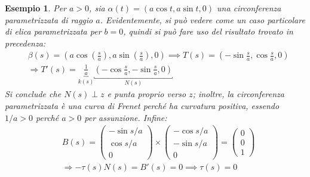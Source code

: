 \documentclass[12pt]{article}
\theoremstyle{style}
\newtheorem{esempio}{Esempio}[section]
\numberwithin{equation}{subsection}
\begin{document}
\begin{esempio}
Per $a>0$, sia $\alpha (t) = (a \cos t, a \sin t, 0)$ una circonferenza parametrizzata di raggio $a$.
Evidentemente, si pu\`o vedere come un caso particolare di elica parametrizzata per $b=0$, quindi si pu\`o fare uso del risultato trovato in precedenza:
\[
	\begin{split}
		&\beta (s) = \left(a \cos \left(\frac{s}{a}\right) , a\sin \left(\frac{s}{a}\right),0 \right)\implies T(s) = \left(- \sin \frac{s}{a}, \cos \frac{s}{a},0 \right) \\
		&\Rightarrow T'(s) = \underbracket{\frac{1}{a}}_{k(s)}  \underbracket{\left(-\cos \frac{s}{a},- \sin \frac{s}{a},0\right) }_{N(s)} 
	\end{split}
\] 
Si conclude che $N(s)\perp z$ e punta proprio verso $z$; inoltre, la circonferenza parametrizzata \`e una curva di Frenet perch\'e ha curvatura positiva, essendo $1 / a > 0 $ perch\'e $a > 0 $ per assunzione.
Infine:
\[
	\begin{split}
		&B(s) = \begin{pmatrix} -\sin s / a \\ \cos s / a \\ 0  \end{pmatrix} \times \begin{pmatrix} - \cos s / a\\ - \sin s / a \\ 0  \end{pmatrix} = \begin{pmatrix} 0 \\0 \\ 1 \end{pmatrix} \\
		&\Rightarrow -\tau (s) N(s) = B'(s) = 0 \implies \tau (s) = 0 
	\end{split}
\] 
\end{esempio}
\end{document}
